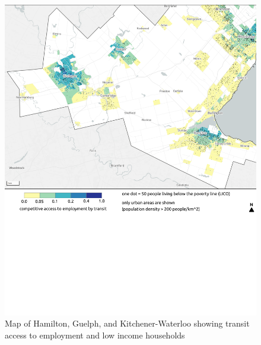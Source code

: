 \documentclass[11 pt, letterpaper]{article}
\begin{document}
{\begin{figure}[H]
	\caption{Map of Hamilton, Guelph, and Kitchener-Waterloo showing transit access to employment and low income households} 
	\label{a_van}
	\centerline{\includegraphics[width=6.5in]{figures/appendix_maps/a_tor_west.png}}
	\vspace{2mm}
\end{figure}


}
\end{document}
